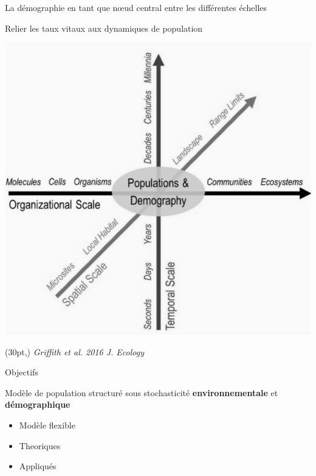 \documentclass[11pt, compress, aspectratio=1610]{beamer}
\newcommand\smallcitation[1]{%
\begin{textblock*}{\textwidth}(30pt,\textheight)
	\raggedleft \footnotesize\textit{#1}
\end{textblock*}}
\providecommand{\tightlist}{%
  \setlength{\itemsep}{0pt}\setlength{\parskip}{0pt}}
\begin{document}
\begin{frame}{La démographie en tant que nœud central entre les
différentes échelles}
\protect\hypertarget{la-duxe9mographie-en-tant-que-nux153ud-central-entre-les-diffuxe9rentes-uxe9chelles}{}

\vspace*{-5mm}

Relier les taux vitaux aux dynamiques de population

\centering

\includegraphics[scale=0.65]{figures/Griffith2016.png}

\par

\smallcitation{Griffith et al. 2016 J. Ecology}

\end{frame}

\begin{frame}{Objectifs}
\protect\hypertarget{objectifs-1}{}

\centering

Modèle de population structuré sous stochasticité
\textbf{environnementale} et \textbf{démographique}

\begin{itemize}
\tightlist
\item
  Modèle flexible
\item
  Theoriques
\item
  Appliqués
\end{itemize}

\end{frame}
\end{document}
